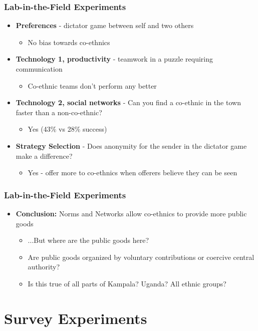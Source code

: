 \documentclass[xcolor=x11names,compress]{beamer}\usepackage[]{graphicx}\usepackage[]{color}
\renewcommand{\(}{\begin{columns}}
\renewcommand{\)}{\end{columns}}
\newcommand{\<}[1]{\begin{column}{#1}}
\renewcommand{\>}{\end{column}}
\begin{document}
\begin{frame}
\frametitle{Lab-in-the-Field Experiments}
\begin{itemize}
\item \textbf{Preferences} - dictator game between self and two others
\begin{itemize}
\item No bias towards co-ethnics
\pause
\end{itemize}
\item \textbf{Technology 1, productivity} - teamwork in a puzzle requiring communication
\begin{itemize}
\item Co-ethnic teams don't perform any better
\pause
\end{itemize}
\item \textbf{Technology 2, social networks} - Can you find a co-ethnic in the town faster than a non-co-ethnic?
\begin{itemize}
\item  Yes (43\% vs 28\% success)
\pause
\end{itemize}
\item \textbf{Strategy Selection} - Does anonymity for the sender in the dictator game make a difference?
\begin{itemize}
\item Yes - offer more to co-ethnics when offerers believe they can be seen
\pause
\end{itemize}
\end{itemize}
\end{frame}

\begin{frame}
\frametitle{Lab-in-the-Field Experiments}
\begin{itemize}
\item \textbf{Conclusion:} Norms and Networks allow co-ethnics to provide more public goods
\pause
\begin{itemize}
\item ...But where are the public goods here?
\item Are public goods organized by voluntary contributions or coercive central authority?
\item Is this true of all parts of Kampala? Uganda? All ethnic groups?
\end{itemize}
\end{itemize}
\end{frame}

\section{Survey Experiments}
\end{document}

